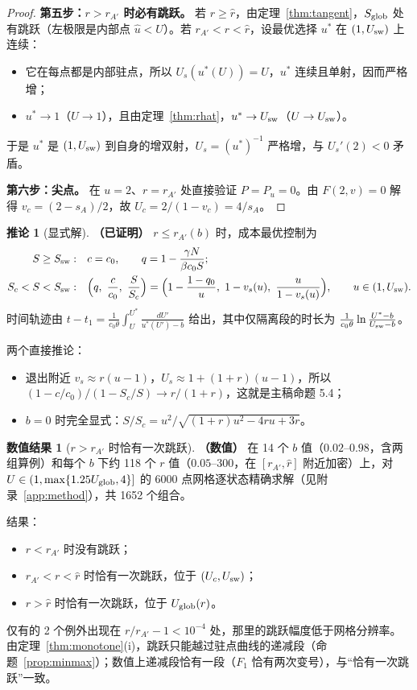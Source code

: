 \documentclass[11pt,a4paper]{ctexart}
\theoremstyle{definition}
\newtheorem{corollary}[theorem]{推论}
\theoremstyle{definition}
\newtheorem{numres}[theorem]{数值结果}
\newcommand{\Usw}{U_{\rm sw}}
\newcommand{\Ssw}{S_{\rm sw}}
\newcommand{\rA}{r_{A'}}
\newcommand{\rhat}{\hat r}
\newcommand{\Uglob}{U_{\rm glob}}
\newcommand{\proven}{\textbf{（已证明）}}
\newcommand{\numer}{\textbf{（数值）}}
\begin{document}
\begin{proof}
\textbf{第五步：$r>\rA$ 时必有跳跃。} 若 $r\ge\rhat$，由定理~\ref{thm:tangent}，$S_{\rm glob}$ 处有跳跃（左极限是内部点 $\hat u<U$）。若 $\rA<r<\rhat$，设最优选择 $u^*$ 在 $(1,\Usw)$ 上连续：
\begin{itemize}
\item 它在每点都是内部驻点，所以 $U_s(u^*(U))=U$，$u^*$ 连续且单射，因而严格增；
\item $u^*\to1$（$U\to1$），且由定理~\ref{thm:rhat}，$u^*\to\Usw$（$U\to\Usw$）。
\end{itemize}
于是 $u^*$ 是 $(1,\Usw)$ 到自身的增双射，$U_s=(u^*)^{-1}$ 严格增，与 $U_s'(2)<0$ 矛盾。

\textbf{第六步：尖点。} 在 $u=2$、$r=\rA$ 处直接验证 $P=P_u=0$。由 $F(2,v)=0$ 解得 $v_c=(2-s_A)/2$，故 $U_c=2/(1-v_c)=4/s_A$。
\end{proof}

\begin{corollary}[显式解]\label{cor:explicit}\proven
$r\le\rA(b)$ 时，成本最优控制为
\begin{align*}
S\ge\Ssw:&\quad c=c_0,\qquad q=1-\frac{\gamma N}{\beta c_0S};\\
S_c<S<\Ssw:&\quad \Bigl(q,\ \frac{c}{c_0},\ \frac S{S_c}\Bigr)=\Bigl(1-\frac{1-q_0}{u},\ 1-v_s(u),\ \frac{u}{1-v_s(u)}\Bigr),\qquad u\in(1,\Usw).
\end{align*}
时间轨迹由 $t-t_1=\frac{1}{c_0\theta}\int_U^{U^*}\frac{dU'}{u^*(U')-b}$ 给出，其中仅隔离段的时长为 $\frac{1}{c_0\theta}\ln\frac{U^*-b}{\Usw-b}$。

两个直接推论：
\begin{itemize}
\item 退出附近 $v_s\approx r(u-1)$，$U_s\approx1+(1+r)(u-1)$，所以 $(1-c/c_0)/(1-S_c/S)\to r/(1+r)$，这就是主稿命题 5.4；
\item $b=0$ 时完全显式：$S/S_c=u^2/\sqrt{(1+r)u^2-4ru+3r}$。
\end{itemize}
\end{corollary}

\begin{numres}[$r>\rA$ 时恰有一次跳跃]\label{num:onejump}\numer
在 14 个 $b$ 值（$0.02$–$0.98$，含两组算例）和每个 $b$ 下约 118 个 $r$ 值（$0.05$–$300$，在 $[\rA,\rhat]$ 附近加密）上，对 $U\in(1,\max\{1.25\Uglob,4\}]$ 的 6000 点网格逐状态精确求解（见附录~\ref{app:method}），共 1652 个组合。

结果：
\begin{itemize}
\item $r<\rA$ 时没有跳跃；
\item $\rA<r<\rhat$ 时恰有一次跳跃，位于 $(U_c,\Usw)$；
\item $r>\rhat$ 时恰有一次跳跃，位于 $\Uglob(r)$。
\end{itemize}
仅有的 2 个例外出现在 $r/\rA-1<10^{-4}$ 处，那里的跳跃幅度低于网格分辨率。由定理~\ref{thm:monotone}(i)，跳跃只能越过驻点曲线的递减段（命题~\ref{prop:minmax}）；数值上递减段恰有一段（$F_1$ 恰有两次变号），与“恰有一次跳跃”一致。
\end{numres}
\end{document}
